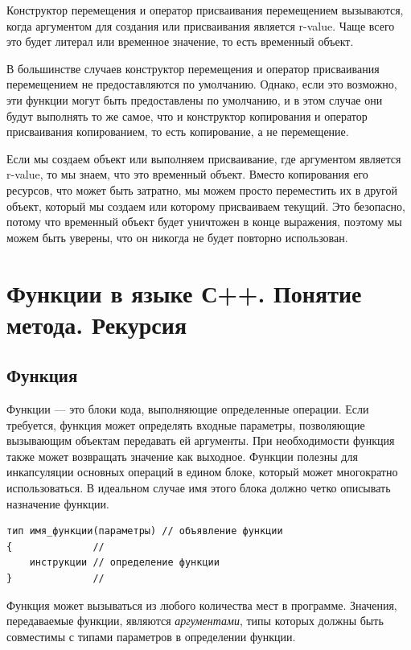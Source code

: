 Конструктор перемещения и оператор присваивания перемещением вызываются, когда аргументом для создания или присваивания является r-value. Чаще всего это будет литерал или временное значение, то есть временный объект.

В большинстве случаев конструктор перемещения и оператор присваивания перемещением не предоставляются по умолчанию. Однако, если это возможно, эти функции могут быть предоставлены по умолчанию, и в этом случае они будут выполнять то же самое, что и конструктор копирования и оператор присваивания копированием, то есть копирование, а не перемещение.

Если мы создаем объект или выполняем присваивание, где аргументом является r-value, то мы знаем, что это временный объект. Вместо копирования его ресурсов, что может быть затратно, мы можем просто переместить их в другой объект, который мы создаем или которому присваиваем текущий. Это безопасно, потому что временный объект будет уничтожен в конце выражения, поэтому мы можем быть уверены, что он никогда не будет повторно использован.

\section{Функции в языке С++. Понятие метода. Рекурсия}

\subsection{Функция}

Функции — это блоки кода, выполняющие определенные операции. Если требуется, функция может определять входные параметры, позволяющие вызывающим объектам передавать ей аргументы. При необходимости функция также может возвращать значение как выходное. Функции полезны для инкапсуляции основных операций в едином блоке, который может многократно использоваться. В идеальном случае имя этого блока должно четко описывать назначение функции.

\begin{verbatim}
тип имя_функции(параметры) // объявление функции
{              // 
    инструкции // определение функции
}              //
\end{verbatim}

Функция может вызываться из любого количества мест в программе. Значения, передаваемые функции, являются \textit{аргументами}, типы которых должны быть совместимы с типами параметров в определении функции.

